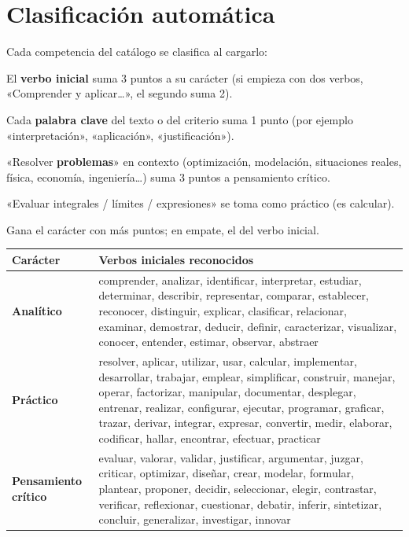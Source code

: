\documentclass[11pt,letterpaper,oneside]{report}
\newcommand{\dimA}{\textcolor{analitico}{\textbf{Analítico}}}
\newcommand{\dimP}{\textcolor{practico}{\textbf{Práctico}}}
\newcommand{\dimC}{\textcolor{critico}{\textbf{Pensamiento crítico}}}
\begin{document}
\section{Clasificación automática}\label{sec:clasificacion}
Cada competencia del catálogo se clasifica al cargarlo:
\begin{pasos}
  \item El \textbf{verbo inicial} suma 3 puntos a su carácter (si empieza con dos verbos, «Comprender y aplicar…», el segundo suma 2).
  \item Cada \textbf{palabra clave} del texto o del criterio suma 1 punto (por ejemplo «interpretación», «aplicación», «justificación»).
  \item «Resolver \textbf{problemas}» en contexto (optimización, modelación, situaciones reales, física, economía, ingeniería…) suma 3 puntos a pensamiento crítico.
  \item «Evaluar integrales / límites / expresiones» se toma como práctico (es calcular).
  \item Gana el carácter con más puntos; en empate, el del verbo inicial.
\end{pasos}

\begin{longtable}{>{\raggedright\arraybackslash}p{2.6cm}>{\raggedright\arraybackslash}p{12.8cm}}
\toprule
\textbf{Carácter} & \textbf{Verbos iniciales reconocidos}\\\midrule\endhead
\dimA & comprender, analizar, identificar, interpretar, estudiar, determinar, describir, representar, comparar, establecer, reconocer, distinguir, explicar, clasificar, relacionar, examinar, demostrar, deducir, definir, caracterizar, visualizar, conocer, entender, estimar, observar, abstraer\\
\dimP & resolver, aplicar, utilizar, usar, calcular, implementar, desarrollar, trabajar, emplear, simplificar, construir, manejar, operar, factorizar, manipular, documentar, desplegar, entrenar, realizar, configurar, ejecutar, programar, graficar, trazar, derivar, integrar, expresar, convertir, medir, elaborar, codificar, hallar, encontrar, efectuar, practicar\\
\dimC & evaluar, valorar, validar, justificar, argumentar, juzgar, criticar, optimizar, diseñar, crear, modelar, formular, plantear, proponer, decidir, seleccionar, elegir, contrastar, verificar, reflexionar, cuestionar, debatir, inferir, sintetizar, concluir, generalizar, investigar, innovar\\
\bottomrule
\end{longtable}
\end{document}
